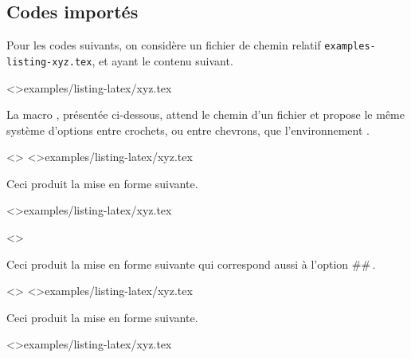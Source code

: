 \documentclass{../main/main}
\begin{document}
\subsection{Codes importés}

Pour les codes suivants, on considère un fichier de chemin relatif \verb+examples-listing-xyz.tex+, et ayant le contenu suivant.


\tdoclatexinput<>{examples/listing-latex/xyz.tex}


\medskip


La macro , présentée ci-dessous, attend le chemin d'un fichier et propose le même système d'options entre crochets, ou entre chevrons, que l'environnement .


\begin{tdocexa}
    \leavevmode

    \begin{tdoclatex}<>
\tdoclatexinput<>{examples/listing-latex/xyz.tex}
    \end{tdoclatex}

    Ceci produit la mise en forme suivante.

    \tdoclatexinput<>{examples/listing-latex/xyz.tex}
\end{tdocexa}


\begin{tdocexa}[À la suite]
    \leavevmode

    \begin{tdoclatex}<>
    \end{tdoclatex}

    Ceci produit la mise en forme suivante qui correspond aussi à l'option \tdoclatexin##\,.

\end{tdocexa}


\begin{tdocexa}
    \leavevmode

    \begin{tdoclatex}<>
\tdoclatexinput<>{examples/listing-latex/xyz.tex}
    \end{tdoclatex}

    Ceci produit la mise en forme suivante.

    \tdoclatexinput<>{examples/listing-latex/xyz.tex}
\end{tdocexa}
\end{document}
